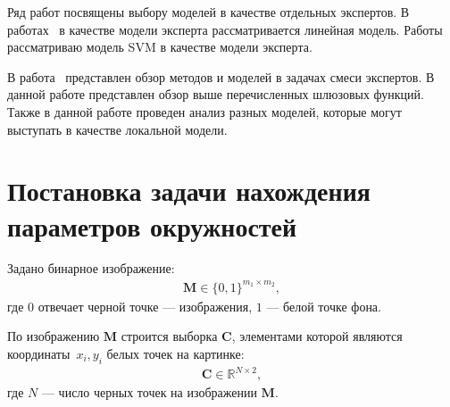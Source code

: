 \documentclass[12pt, twoside]{article}
\numberwithin{equation}{section}
\begin{document}
Ряд работ посвящены выбору моделей в качестве отдельных экспертов. В работах~\cite{Jordan1994, Jordan1991} в качестве модели эксперта рассматривается линейная модель. Работы~\cite{Lima2007, Cao2003} рассматриваю модель SVM в качестве модели эксперта.

В работа~\cite{Yuksel2012} представлен обзор методов и моделей в задачах смеси экспертов. В данной работе представлен обзор выше перечисленных шлюзовых функций. Также в данной работе проведен анализ разных моделей, которые могут выступать в качестве локальной модели.


\section{Постановка задачи нахождения параметров окружностей}
Задано бинарное изображение:
\begin{equation}
\label{eq:st:cr:1}
\begin{aligned}
\textbf{M} \in \{0,1\}^{m_1 \times m_2},
\end{aligned}
\end{equation}
где $0$ отвечает черной точке --- изображения, $1$ --- белой точке фона.

По изображению $\textbf{M}$ строится выборка $\textbf{C}$, элементами которой являются координаты~$x_i, y_i$ белых точек на картинке:
\begin{equation}
\label{eq:st:cr:2}
\begin{aligned}
\textbf{C} \in  \mathbb{R}^{N \times 2},
\end{aligned}
\end{equation}
где $N$ --- число черных точек на изображении $\textbf{M}$.
\end{document}
